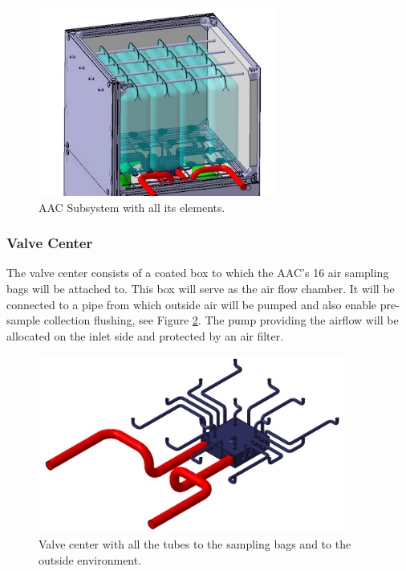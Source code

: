 \documentclass[a4paper,12pt,twoside]{article}
\providecommand{\DIFaddbegin}{} %
\providecommand{\DIFaddend}{} %
\providecommand{\DIFaddbeginFL}{} %
\providecommand{\DIFaddendFL}{} %
\providecommand{\DIFdelbeginFL}{} %
\providecommand{\DIFdelendFL}{} %
\newcommand{\DIFscaledelfig}{0.5}
\newlength{\DIFdelgraphicswidth} %
\newlength{\DIFdelgraphicsheight} %
\newcommand{\DIFaddincludegraphics}[2][]{{\color{blue}\fbox{\DIFOincludegraphics[#1]{#2}}}} %
\newcommand{\DIFdelincludegraphics}[2][]{%
\sbox{\DIFdelgraphicsbox}{\DIFOincludegraphics[#1]{#2}}%
\settoboxwidth{\DIFdelgraphicswidth}{\DIFdelgraphicsbox} %
\settoboxtotalheight{\DIFdelgraphicsheight}{\DIFdelgraphicsbox} %
\scalebox{\DIFscaledelfig}{%
\parbox[b]{\DIFdelgraphicswidth}{\usebox{\DIFdelgraphicsbox}\\[-\baselineskip] \rule{\DIFdelgraphicswidth}{0em}}\llap{\resizebox{\DIFdelgraphicswidth}{\DIFdelgraphicsheight}{%
\setlength{\unitlength}{\DIFdelgraphicswidth}%
\begin{picture}(1,1)%
\thicklines\linethickness{2pt} %
{\color[rgb]{1,0,0}\put(0,0){\framebox(1,1){}}}%
{\color[rgb]{1,0,0}\put(0,0){\line( 1,1){1}}}%
{\color[rgb]{1,0,0}\put(0,1){\line(1,-1){1}}}%
\end{picture}%
}\hspace*{3pt}}} %
} %
\DeclareRobustCommand{\DIFaddbegin}{\DIFOaddbegin \let\includegraphics\DIFaddincludegraphics} %
\DeclareRobustCommand{\DIFaddend}{\DIFOaddend \let\includegraphics\DIFOincludegraphics} %
\DeclareRobustCommand{\DIFaddbeginFL}{\DIFOaddbeginFL \let\includegraphics\DIFaddincludegraphics} %
\DeclareRobustCommand{\DIFaddendFL}{\DIFOaddendFL \let\includegraphics\DIFOincludegraphics} %
\DeclareRobustCommand{\DIFdelbeginFL}{\DIFOdelbeginFL \let\includegraphics\DIFdelincludegraphics} %
\DeclareRobustCommand{\DIFdelendFL}{\DIFOaddendFL \let\includegraphics\DIFOincludegraphics} %
\begin{document}

\begin{figure}[!ht]
    \centering
    \includegraphics[width=0.7\textwidth]{4-experiment-design/img/anchored_bags.jpg}
    \caption{AAC Subsystem with all its elements.}
    \label{anchor_bags}
\end{figure}

\DIFaddbegin \pagebreak
\DIFaddend \subsubsection{Valve Center}

The valve center consists of a coated box to which the AAC's 16 air sampling bags will be attached to. This box will serve as the air flow chamber. It will be connected to a pipe from which outside air will be pumped and also enable pre-sample collection flushing, see Figure \ref{valve_center_and_pipes}. The pump providing the airflow will be allocated on the inlet side and protected by an air filter. 


\begin{figure}[!ht]
    \centering
    \DIFdelbeginFL %
\DIFdelendFL \DIFaddbeginFL \includegraphics[width=0.9\textwidth]{4-experiment-design/img/valve_collector.jpg}
    \DIFaddendFL \caption{Valve center with all the tubes to the sampling bags and to the outside environment.}
    \label{valve_center_and_pipes}
\end{figure}
\end{document}
